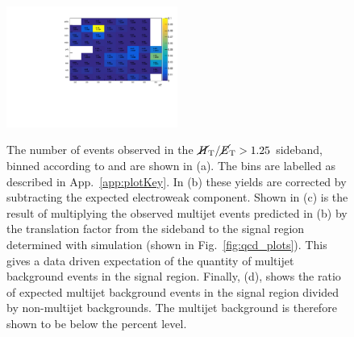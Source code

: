 \begin{figure}[!h]
{    \includegraphics[width=0.5\textwidth]{figs/analysis/qcdMethod/predictedQcdDivEwk_Signal}
  } \\
  \caption{The number of events observed in the $\mbox{$\mbox{$\cancel{H}_\text{T}$} / \mbox{$\cancel{E}_\text{T}$}$}>1.25$ sideband, 
    binned according to \njet and \scalht are shown in (a). The bins are
    labelled as described in App.~\ref{app:plotKey}. In
    (b) these yields are corrected by subtracting the expected
    electroweak component. Shown in
    (c) is the result of multiplying the observed multijet events predicted
    in (b) by the translation factor from the sideband to the signal
    region determined with simulation (shown in
    Fig.~\ref{fig:qcd_plots}). This gives a data driven expectation of
    the quantity of multijet background events in the signal region. 
    Finally, (d), shows the ratio of expected
    multijet background events in the signal region divided by
    non-multijet backgrounds. The multijet background is therefore
    shown to be below the percent level.}
  \label{fig:qcd_plots2}
\end{figure}


